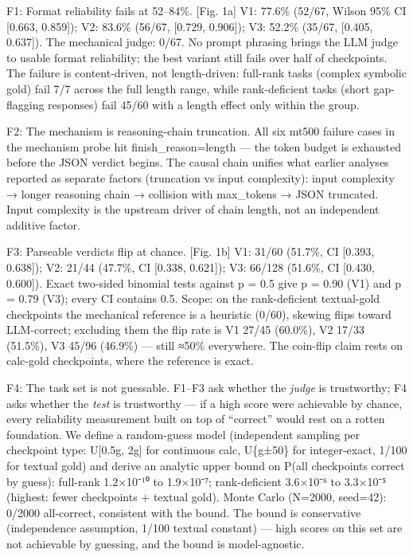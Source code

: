\documentclass[10pt]{article}
\begin{document}
F1: Format reliability fails at 52–84\%. [Fig. 1a] V1: 77.6\% (52/67, Wilson 95\% CI [0.663, 0.859]); V2: 83.6\% (56/67, [0.729, 0.906]); V3: 52.2\% (35/67, [0.405, 0.637]). The mechanical judge: 0/67. No prompt phrasing brings the LLM judge to usable format reliability; the best variant still fails over half of checkpoints. The failure is content-driven, not length-driven: full-rank tasks (complex symbolic gold) fail 7/7 across the full length range, while rank-deficient tasks (short gap-flagging responses) fail 45/60 with a length effect only within the group.

F2: The mechanism is reasoning-chain truncation. All six mt500 failure cases in the mechanism probe hit finish\_reason=length — the token budget is exhausted before the JSON verdict begins. The causal chain unifies what earlier analyses reported as separate factors (truncation vs input complexity): input complexity → longer reasoning chain → collision with max\_tokens → JSON truncated. Input complexity is the upstream driver of chain length, not an independent additive factor.

F3: Parseable verdicts flip at chance. [Fig. 1b] V1: 31/60 (51.7\%, CI [0.393, 0.638]); V2: 21/44 (47.7\%, CI [0.338, 0.621]); V3: 66/128 (51.6\%, CI [0.430, 0.600]). Exact two-sided binomial tests against p = 0.5 give p = 0.90 (V1) and p = 0.79 (V3); every CI contains 0.5. Scope: on the rank-deficient textual-gold checkpoints the mechanical reference is a heuristic (0/60), skewing flips toward LLM-correct; excluding them the flip rate is V1 27/45 (60.0\%), V2 17/33 (51.5\%), V3 45/96 (46.9\%) — still ≈50\% everywhere. The coin-flip claim rests on calc-gold checkpoints, where the reference is exact.

F4: The task set is not guessable. F1--F3 ask whether the \emph{judge} is trustworthy; F4 asks whether the \emph{test} is trustworthy --- if a high score were achievable by chance, every reliability measurement built on top of ``correct'' would rest on a rotten foundation. We define a random-guess model (independent sampling per checkpoint type: U[0.5g, 2g] for continuous calc, U\{g±50\} for integer-exact, 1/100 for textual gold) and derive an analytic upper bound on P(all checkpoints correct by guess): full-rank 1.2×10⁻¹⁰ to 1.9×10⁻⁷; rank-deficient 3.6×10⁻⁶ to 3.3×10⁻⁵ (highest: fewer checkpoints + textual gold). Monte Carlo (N=2000, seed=42): 0/2000 all-correct, consistent with the bound. The bound is conservative (independence assumption, 1/100 textual constant) --- high scores on this set are not achievable by guessing, and the bound is model-agnostic.
\end{document}
